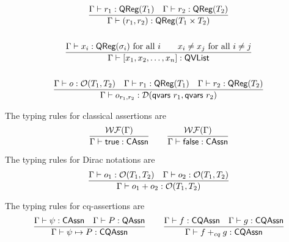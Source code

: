 \begin{gather*}
    \\
    \frac{\Gamma \vdash r_1 : \textsf{QReg}(T_1) \quad \Gamma \vdash r_2 : \textsf{QReg}(T_2)}{\Gamma \vdash (r_1, r_2) : \textsf{QReg}(T_1 \times T_2)}
    \\
    \\
    \frac{\Gamma \vdash x_i : \textsf{QReg}(\sigma_i) \text{ for all } i \qquad x_i \neq x_j \text{ for all } i \neq j}{\Gamma \vdash [x_1, x_2, \dots, x_n] : \textsf{QVList}} \\
    \\
    \frac{\Gamma \vdash o : \mathcal{O}(T_1, T_2) \quad \Gamma \vdash r_1 : \textsf{QReg}(T_1) \quad \Gamma \vdash r_2 : \textsf{QReg}(T_2)}{\Gamma \vdash o_{r_1,r_2} : \mathcal{D}(\textsf{qvars}\ r_1, \textsf{qvars}\ r_2)}
\end{gather*}

The typing rules for classical assertions are
\begin{gather*}
    \frac{\mathcal{WF}(\Gamma)}{\Gamma \vdash \textsf{true}: \textsf{CAssn}}
    \qquad
    \frac{\mathcal{WF}(\Gamma)}{\Gamma \vdash \textsf{false}: \textsf{CAssn}}
\end{gather*}

The typing rules for Dirac notations are
\begin{gather*}
    \frac{\Gamma \vdash o_1 : \mathcal{O}(T_1, T_2) \quad \Gamma \vdash o_2 : \mathcal{O}(T_1, T_2)}{\Gamma \vdash o_1 + o_2 : \mathcal{O}(T_1, T_2)}
\end{gather*}

The typing rules for cq-assertions are
\begin{gather*}
    \frac{\Gamma \vdash \psi : \textsf{CAssn} \quad \Gamma \vdash P : \textsf{QAssn}}{\Gamma \vdash \psi \mapsto P : \textsf{CQAssn}}
    \qquad
    \frac{\Gamma \vdash f : \textsf{CQAssn} \quad \Gamma \vdash g : \textsf{CQAssn}}{\Gamma \vdash f +_{cq} g : \textsf{CQAssn}}
\end{gather*}


